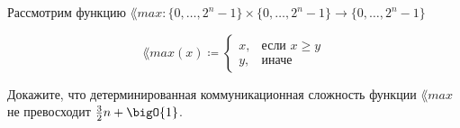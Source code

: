 Рассмотрим функцию $\lang{max}\colon \{0, \dots, 2^n - 1\} \times \{0, \dots, 2^n - 1\} \to \{0, \dots,
2^n - 1\}$

$$ \lang{max}(x) \coloneqq
    \begin{cases}
        x, & \text{если } x \ge y \\
        y, & \text{иначе}
    \end{cases}
$$

Докажите, что детерминированная коммуникационная сложность функции $\lang{max}$ не превосходит
$\frac{3}{2}n + \bigO{1}$.